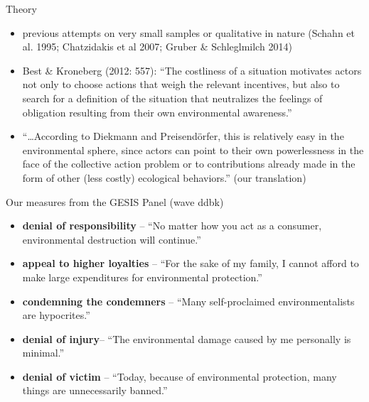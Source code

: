\documentclass[final]{beamer}
\newlength{\colwidth}
\begin{document}
\begin{frame}[t]
\begin{columns}[t]
\begin{column}{\colwidth}
\begin{alertblock}{Theory}

\begin{itemize}
\item previous attempts on very small samples or qualitative in nature (Schahn et al. 1995; Chatzidakis et al 2007; Gruber \& Schleglmilch 2014)
\item Best \& Kroneberg (2012: 557): \enquote{The costliness of a situation motivates actors not only to choose actions that weigh the relevant incentives, but also to search for a definition of the situation that neutralizes the feelings of obligation resulting from their own environmental awareness.}
\item \enquote{\dots According to Diekmann and Preisendörfer, this is relatively easy in the environmental sphere, since actors can point to their own powerlessness in the face of the collective action problem or to contributions already made in the form of other (less costly) ecological behaviors.}  (our translation)
\end{itemize}


Our measures from the GESIS Panel (wave ddbk)

\begin{itemize}
\item \textbf{denial of responsibility} -- \enquote{No matter how you act as a consumer, environmental destruction will continue.}
\item \textbf{appeal to higher loyalties} -- \enquote{For the sake of my family, I cannot afford to make large expenditures for environmental protection.}
\item \textbf{condemning the condemners} -- \enquote{Many self-proclaimed environmentalists are hypocrites.}
\item \textbf{denial of injury}-- \enquote{The environmental damage caused by me personally is minimal.}
\item \textbf{denial of victim} -- \enquote{Today, because of environmental protection, many things are unnecessarily banned.}
	\end{itemize}



\end{alertblock}
\end{column}
\end{columns}
\end{frame}
\end{document}
